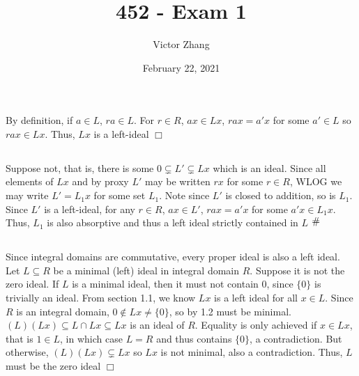 \documentclass{article}
\title{452 - Exam 1}
\author{Victor Zhang}
\date{February 22, 2021}
\newcommand{\contra}{\raisebox{\depth}{\#}}
\begin{document}
\maketitle

\section{}
\subsection{}
By definition, if $a \in L$, $ra \in L$. For $r \in R$, $ax \in Lx$, $rax = a'x$ for some $a' \in L$ so $rax \in Lx$. Thus, $Lx$ is a left-ideal $\Box$
\subsection{}
Suppose not, that is, there is some $0 \subsetneq L' \subsetneq Lx$ which is an ideal. Since all elements of $Lx$ and by proxy $L'$ may be written $rx$ for some $r \in R$, WLOG we may write $L' = L_1x$ for some set $L_1$. Note since $L'$ is closed to addition, so is $L_1$. Since $L'$ is a left-ideal, for any $r \in R$, $ax \in L'$, $rax = a'x$ for some $a'x \in L_1x$. Thus, $L_1$ is also absorptive and thus a left ideal strictly contained in $L$ $\contra$
\subsection{}
Since integral domains are commutative, every proper ideal is also a left ideal. Let $L \subseteq R$ be a minimal (left) ideal in integral domain $R$. Suppose it is not the zero ideal. If $L$ is a minimal ideal, then it must not contain $0$, since $\{0\}$ is trivially an ideal. From section 1.1, we know $Lx$ is a left ideal for all $x \in L$. Since $R$ is an integral domain, $0 \notin Lx \neq \{0\}$, so by 1.2 must be minimal. $(L)(Lx) \subseteq L \cap Lx \subseteq Lx$ is an ideal of $R$. Equality is only achieved if $x \in Lx$, that is $1 \in L$, in which case $L = R$ and thus contains $\{0\}$, a contradiction. But otherwise, $(L)(Lx) \subsetneq Lx$ so $Lx$ is not minimal, also a contradiction. Thus, $L$ must be the zero ideal $\Box$

\section{}
\end{document}
